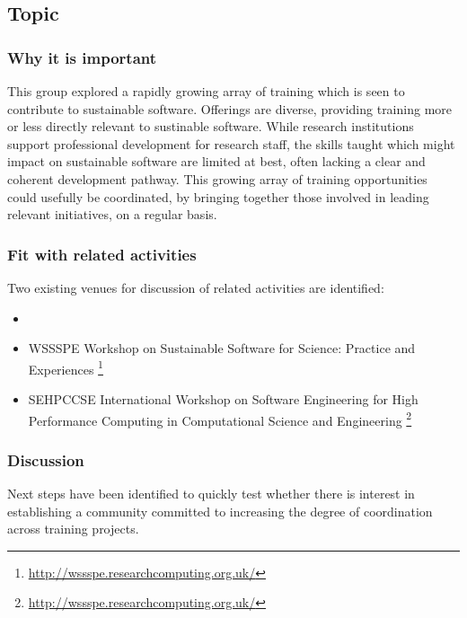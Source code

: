 \subsection{Topic} 

\subsubsection{Why it is important}

This group explored a rapidly growing array of training which is seen to contribute to sustainable software. Offerings are diverse, providing training more or less directly relevant to sustinable software. While research institutions  support professional development for research staff, the skills taught which might impact on sustainable software are limited at best, often lacking a clear and coherent development pathway. This growing array of training opportunities could usefully be coordinated, by bringing together those involved in leading relevant initiatives, on a regular basis.

\subsubsection{Fit with related activities}
Two existing venues for discussion of related activities are identified:

\begin{itemize}

\item
\item
WSSSPE Workshop on Sustainable Software for Science: Practice and Experiences \footnote{\url{http://wssspe.researchcomputing.org.uk/}}

\item
SEHPCCSE International Workshop on Software Engineering for High Performance Computing in Computational Science and Engineering \footnote{\url{http://wssspe.researchcomputing.org.uk/}}

\end{itemize}

\subsubsection{Discussion}

Next steps have been identified to quickly test whether there is interest in establishing a community committed to increasing the degree of coordination across training projects.


